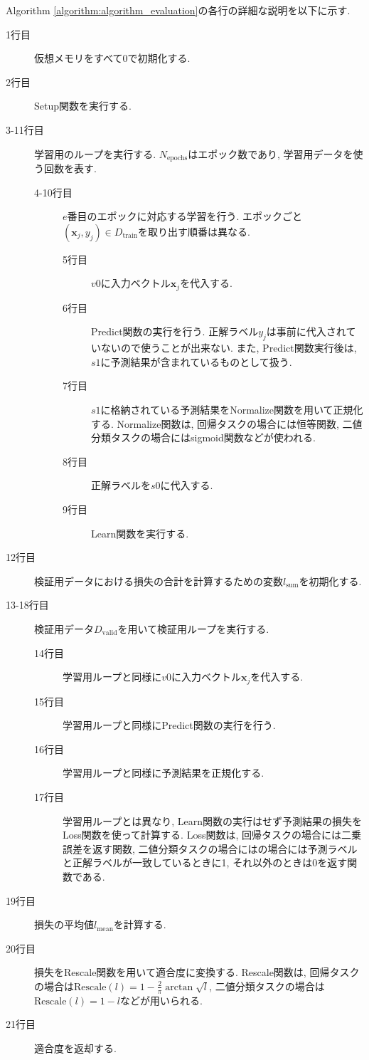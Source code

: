 \documentclass[11pt,oneside,openany,report]{jsbook}
\begin{document}
Algorithm \ref{algorithm:algorithm_evaluation}の各行の詳細な説明を以下に示す.

\begin{description}
  \item[1行目] 仮想メモリをすべて0で初期化する.
  \item[2行目] Setup関数を実行する.
  \item[3-11行目] 学習用のループを実行する. $N_\mathrm{epochs}$はエポック数であり, 学習用データを使う回数を表す.
    \begin{description}
      \item[4-10行目] $e$番目のエポックに対応する学習を行う. エポックごと$(\bm{x}_j, y_j) \in D_\mathrm{train}$を取り出す順番は異なる.
        \begin{description}
          \item[5行目] $v0$に入力ベクトル$\bm{x}_j$を代入する.
          \item[6行目] Predict関数の実行を行う. 正解ラベル$y_j$は事前に代入されていないので使うことが出来ない. また, Predict関数実行後は, $s1$に予測結果が含まれているものとして扱う.
          \item[7行目] $s1$に格納されている予測結果をNormalize関数を用いて正規化する. Normalize関数は, 回帰タスクの場合には恒等関数, 二値分類タスクの場合にはsigmoid関数などが使われる.
          \item[8行目] 正解ラベルを$s0$に代入する.
          \item[9行目] Learn関数を実行する.
        \end{description}
    \end{description}
  \item[12行目] 検証用データにおける損失の合計を計算するための変数$l_\mathrm{sum}$を初期化する.
  \item[13-18行目] 検証用データ$D_\mathrm{valid}$を用いて検証用ループを実行する.
    \begin{description}
      \item[14行目] 学習用ループと同様に$v0$に入力ベクトル$\bm{x}_j$を代入する.
      \item[15行目] 学習用ループと同様にPredict関数の実行を行う.
      \item[16行目] 学習用ループと同様に予測結果を正規化する.
      \item[17行目] 学習用ループとは異なり, Learn関数の実行はせず予測結果の損失をLoss関数を使って計算する. Loss関数は, 回帰タスクの場合には二乗誤差を返す関数, 二値分類タスクの場合にはの場合には予測ラベルと正解ラベルが一致しているときに1, それ以外のときは0を返す関数である.
    \end{description}
  \item[19行目] 損失の平均値$l_\mathrm{mean}$を計算する.
  \item[20行目] 損失をRescale関数を用いて適合度に変換する. Rescale関数は, 回帰タスクの場合は$\mathrm{Rescale}(l) = 1 - \frac{2}{\pi} \arctan{\sqrt{l}} $, 二値分類タスクの場合は$\mathrm{Rescale}(l) = 1 - l$などが用いられる.
  \item[21行目] 適合度を返却する.
\end{description}
\end{document}
